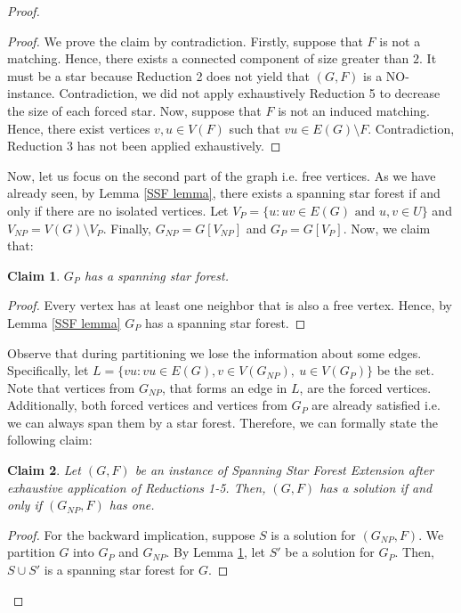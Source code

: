 \documentclass[en]{pracamgr}
\newtheorem{claim}{Claim}
\theoremstyle{definition}
\newcommand{\ssf}{spanning star forest}
\newcommand{\ssfep}{{\sc Spanning Star Forest Extension}}
\begin{document}
\begin{proof}
	\begin{proof}
		We prove the claim by contradiction. Firstly, suppose that $F$ is not a matching. Hence, there exists a connected component of size greater than $2$. It must be a star because Reduction 2 does not yield that $(G,F)$ is a NO-instance. Contradiction, we did not apply exhaustively Reduction 5 to decrease the size of each forced star. Now, suppose that $F$ is not an induced matching. Hence, there exist vertices $v,u \in V(F)$ such that $vu \in E(G) \setminus F$. Contradiction, Reduction 3 has not been applied exhaustively.
	\end{proof}

	Now, let us focus on the second part of the graph i.e. free vertices. As we have already seen, by Lemma \ref{SSF lemma}, there exists a spanning star forest if and only if there are no isolated vertices. Let $V_P = \{u: uv \in E(G) \text{ and } u,v \in U\}$ and $V_{NP} = V(G) \setminus V_P$. Finally, $G_{NP} = G[V_{NP}]$ and $G_P = G[V_P]$. Now, we claim that:

	\begin{claim}\label{GP partition}
		$G_P$ has a spanning star forest.
	\end{claim}
	
	\begin{proof}
		Every vertex has at least one neighbor that is also a free vertex. Hence, by Lemma \ref{SSF lemma} $G_P$ has a spanning star forest.
	\end{proof}

	Observe that during partitioning we lose the information about some edges. Specifically, let $L= \{vu: vu \in E(G), v \in V(G_{NP}),\ u \in V(G_P)\}$ be the set. Note that vertices from $G_{NP}$, that forms an edge in $L$, are the forced vertices. Additionally, both forced vertices and vertices from $G_P$ are already satisfied i.e. we can always span them by a star forest. Therefore, we can formally state the following claim:
	
	\begin{claim}\label{GNP partition}
		Let $(G,F)$ be an instance of \ssfep{} after exhaustive application of Reductions 1-5. Then, $(G,F)$ has a solution if and only if $(G_{NP},F)$ has one.
	\end{claim}

	\begin{proof}
		For the backward implication, suppose $S$ is a solution for $(G_{NP},F)$. We  partition $G$ into $G_P$ and $G_{NP}$. By Lemma \ref{GP partition}, let $S'$ be a solution for $G_P$. Then, $S \cup S'$ is a \ssf{} for $G$.
		

\end{proof}
\end{proof}
\end{document}
